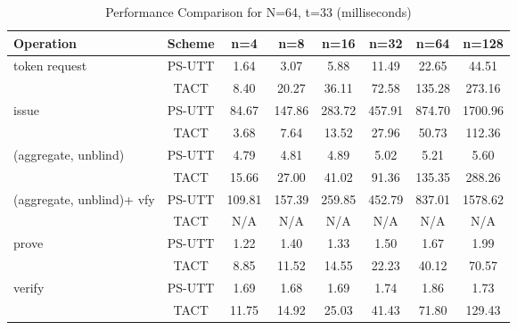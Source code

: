 \begin{table}[htbp]
\centering
\caption{Performance Comparison for N=64, t=33 (milliseconds)}
\begin{tabular}{lccccccc}
\toprule
\textbf{Operation} & \textbf{Scheme} & \textbf{n=4} & \textbf{n=8} & \textbf{n=16} & \textbf{n=32} & \textbf{n=64} & \textbf{n=128} \\
\midrule
token request & PS-UTT & 1.64 & 3.07 & 5.88 & 11.49 & 22.65 & 44.51 \\
 & TACT & 8.40 & 20.27 & 36.11 & 72.58 & 135.28 & 273.16 \\
\midrule
issue & PS-UTT & 84.67 & 147.86 & 283.72 & 457.91 & 874.70 & 1700.96 \\
 & TACT & 3.68 & 7.64 & 13.52 & 27.96 & 50.73 & 112.36 \\
\midrule
(aggregate, unblind) & PS-UTT & 4.79 & 4.81 & 4.89 & 5.02 & 5.21 & 5.60 \\
 & TACT & 15.66 & 27.00 & 41.02 & 91.36 & 135.35 & 288.26 \\
\midrule
(aggregate, unblind)+ vfy & PS-UTT & 109.81 & 157.39 & 259.85 & 452.79 & 837.01 & 1578.62 \\
 & TACT & N/A & N/A & N/A & N/A & N/A & N/A \\
\midrule
prove & PS-UTT & 1.22 & 1.40 & 1.33 & 1.50 & 1.67 & 1.99 \\
 & TACT & 8.85 & 11.52 & 14.55 & 22.23 & 40.12 & 70.57 \\
\midrule
verify & PS-UTT & 1.69 & 1.68 & 1.69 & 1.74 & 1.86 & 1.73 \\
 & TACT & 11.75 & 14.92 & 25.03 & 41.43 & 71.80 & 129.43 \\
\bottomrule
\end{tabular}
\label{tab:perf-comp-64-33}
\end{table}
